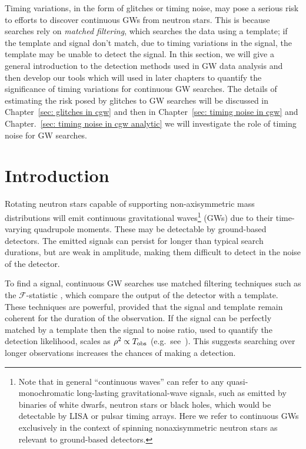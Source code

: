 \documentclass[../full_thesis/full_thesis.tex]{subfiles}
\begin{document}
Timing variations, in the form of glitches or timing noise, may pose a serious
risk to efforts to discover continuous GWs from neutron stars. This is because
searches rely on \emph{matched filtering}, which searches the data using a
template; if the template and signal don't match, due to timing variations in
the signal, the template may be unable to detect the signal. In this section,
we will give a general introduction to the detection methods used in GW data
analysis and then develop our tools which will used in later chapters to
quantify the significance of timing variations for continuous GW searches. The
details of estimating the risk posed by glitches to GW searches will be
discussed in Chapter~\ref{sec: glitches in cgw} and then in Chapter~\ref{sec:
timing noise in cgw} and Chapter.~\ref{sec: timing noise in cgw analytic} we
will investigate the role of timing noise for GW searches.

\section{Introduction}
\label{sec: introduction cgw}
Rotating neutron stars capable of supporting non-axisymmetric mass
distributions will emit continuous gravitational
waves\footnote{Note that in general ``continuous waves'' can
    refer to any quasi-monochromatic long-lasting gravitational-wave
        signals, such as emitted by binaries of white dwarfs, neutron
        stars or black holes, which would be detectable by LISA or pulsar
        timing arrays. Here we refer to continuous GWs exclusively in the context of
        spinning nonaxisymmetric neutron stars as relevant to ground-based
        detectors.}
(GWs) due to their
time-varying quadrupole moments. These may be detectable by ground-based detectors. The emitted
signals can persist for longer than
typical search durations, but are weak in amplitude, making them difficult to detect
in the noise of the detector.

To find a signal, continuous GW searches use matched
filtering techniques such as the $\mathcal{F}$-statistic \citep{Jaranowski1998},
which compare the output of the detector with a template.  These techniques are
powerful, provided that the signal and template remain coherent for the duration
of the observation. If the signal can be perfectly matched by a template then
the signal to noise ratio, used to quantify the detection likelihood, scales as
$\rho^{2} \propto T_{\textrm{obs}}$ (e.g.\ see~\citep{Prix2009}). This suggests searching
over longer observations increases the chances of making a detection.
\end{document}
